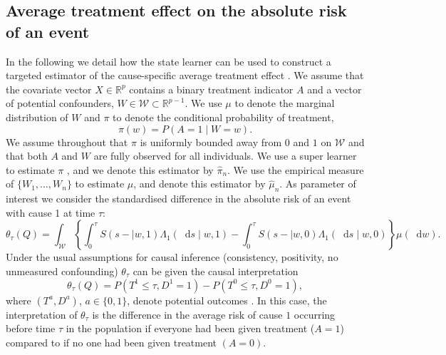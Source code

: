 \documentclass[numsec,webpdf,contemporary,medium,namedate]{oup-authoring-template}%
\theoremstyle{thmstyleone}%
\theoremstyle{thmstyletwo}%
\theoremstyle{thmstylethree}%
\newcommand{\R}{\mathbb{R}}
\newcommand*\diff{\mathop{}\!\mathrm{d}}
\newcommand{\1}{\mathds{1}}
\begin{document}
\subsection{Average treatment effect on the absolute risk of an event}
\label{sec:cause-spec-aver}

In the following we detail how the state learner can be used to
construct a targeted estimator of the cause-specific average treatment
effect \citep{rytgaard2022targeted}. We assume that the covariate
vector \( X \in \R^p \) contains a binary treatment indicator \( A \)
and a vector of potential confounders,
\( W \in \mathcal{W}\subset \R^{p-1} \).  We use $\mu$ to denote the
marginal distribution of \( W \) and $\pi$ to denote the conditional
probability of treatment,
\begin{equation*}
  \pi(w) = P(A=1 \mid W=w).
\end{equation*}
We assume throughout that $\pi$ is uniformly bounded away from \( 0 \)
and \( 1 \) on \( \mathcal{W} \) and that both \( A \) and \( W \) are
fully observed for all individuals. We use a super learner to
estimate $\pi$ \citep{Polley_Ledell_Kennedy_Laan_2023_Superlearn}, and
we denote this estimator by $\hat{\pi}_n$. We use the empirical
measure of \( \{W_1, \dots, W_n\} \) to estimate $\mu$, and denote
this estimator by $\hat{\mu}_n$. As parameter of interest we consider
the standardised difference in the absolute risk of an event with
cause 1 at time $\tau$:
\begin{equation*}
  \theta_{{\tau}}(Q) = \int_{\mathcal{W}} 
  \left\{
    \int_0^{\tau}
    S(s- \mid w, 1)  \Lambda_1(\diff s \mid w, 1)
    -
    \int_0^{\tau}
    S(s- \mid w, 0)  \Lambda_1(\diff s \mid w, 0)
  \right\}
  \mu(\diff w).
\end{equation*}
Under the usual assumptions for causal inference (consistency,
positivity, no unmeasured confounding) \( \theta_{{\tau}} \) can be
given the causal interpretation
\begin{equation*}
  \theta_{{\tau}}(Q) =
  P{(T^{1} \leq \tau, D^{1}=1)}-
  P{(T^{0} \leq \tau, D^{0}=1)},
\end{equation*}
where \( (T^a, D^a) \), \( a \in \{0,1\} \), denote potential outcomes
\citep{hernanRobinsWhatIf}. In this case, the interpretation of $\theta_{\tau}$
is the difference in the average risk of cause \( 1 \) occurring before time
\( \tau \) in the population if everyone had been given treatment (\( A=1 \))
compared to if no one had been given treatment \( (A=0) \).
\end{document}
